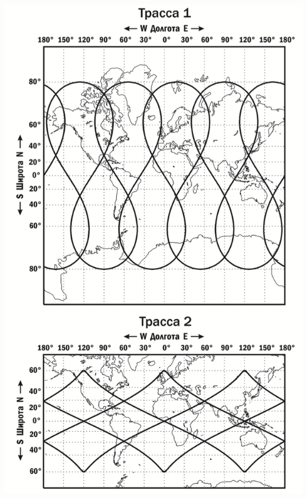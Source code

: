 \documentclass[12pt]{article}
\begin{document}
    \includegraphics[width = 0.8\linewidth]{trassa.png}
\end{document}
